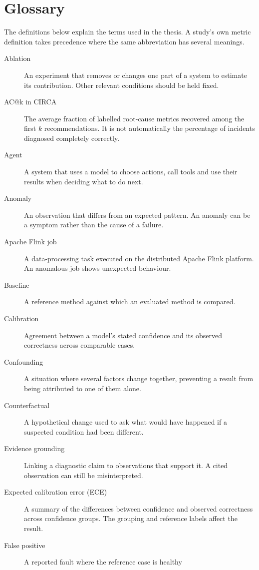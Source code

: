 \chapter{Glossary}
\label{app:glossary}

The definitions below explain the terms used in the thesis. A study's own
metric definition takes precedence where the same abbreviation has several
meanings.

\begin{description}
\item[Ablation] An experiment that removes or changes one part of a system
to estimate its contribution. Other relevant conditions should be held fixed.
\item[AC@k in CIRCA] The average fraction of labelled root-cause metrics
recovered among the first $k$ recommendations. It is not automatically the
percentage of incidents diagnosed completely correctly.
\item[Agent] A system that uses a model to choose actions, call tools and
use their results when deciding what to do next.
\item[Anomaly] An observation that differs from an expected pattern.
An anomaly can be a symptom rather than the cause of a failure.
\item[Apache Flink job] A data-processing task executed on the distributed
Apache Flink platform. An anomalous job shows unexpected behaviour.
\item[Baseline] A reference method against which an evaluated method is compared.
\item[Calibration] Agreement between a model's stated confidence and its
observed correctness across comparable cases.
\item[Confounding] A situation where several factors change together,
preventing a result from being attributed to one of them alone.
\item[Counterfactual] A hypothetical change used to ask what would have
happened if a suspected condition had been different.
\item[Evidence grounding] Linking a diagnostic claim to observations that
support it. A cited observation can still be misinterpreted.
\item[Expected calibration error (ECE)] A summary of the differences between
confidence and observed correctness across confidence groups. The grouping
and reference labels affect the result.
\item[False positive] A reported fault where the reference case is healthy

\end{description}

